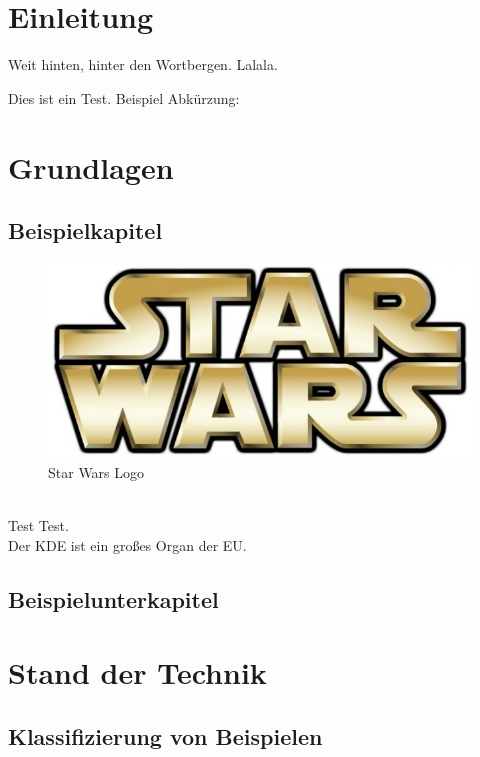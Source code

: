 \chapter{Einleitung}\label{sec:einleitung}
Weit hinten, hinter den Wortbergen. Lalala.

Dies ist ein Test. Beispiel Abkürzung:


\chapter{Grundlagen}\label{sec:grundlagen}


\section{Beispielkapitel}\label{sec:beispiel}
\begin{figure}[htb]
  \centering  
  \includegraphics[scale=0.5]{img/starwars.jpg}
  \caption{Star Wars Logo}\label{fig:starwars}
\end{figure}
\\

Test Test.\\
Der \ac{KDE} ist ein großes Organ der EU.\


\section{Beispielunterkapitel}\label{subsec:beispiel}


\chapter{Stand der Technik}\label{cha:stand_der_technik}

\section{Klassifizierung von Beispielen}\label{sec:klassifizierung}
